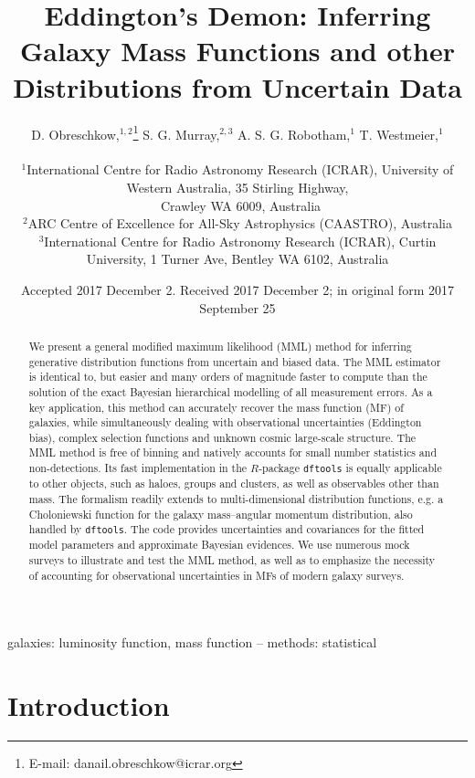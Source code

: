\documentclass[a4paper,fleqn,usenatbib]{mnras}
\title[Eddington's Demon]{Eddington's Demon: Inferring Galaxy Mass Functions and other Distributions from Uncertain Data}
\author[D. Obreschkow et al.]{
D. Obreschkow,$^{1,2}$\thanks{E-mail: danail.obreschkow@icrar.org}
S. G. Murray,$^{2,3}$
A. S. G. Robotham,$^1$
T. Westmeier,$^1$
\\
\\
$^{1}$International Centre for Radio Astronomy Research (ICRAR), University of Western Australia, 35 Stirling Highway,\\
~Crawley WA 6009, Australia\\
$^{2}$ARC Centre of Excellence for All-Sky Astrophysics (CAASTRO), Australia\\
$^{3}$International Centre for Radio Astronomy Research (ICRAR), Curtin University, 1 Turner Ave, Bentley WA 6102, Australia
}
\date{Accepted 2017 December 2. Received 2017 December 2; in original form 2017 September 25}
\newcommand{\dftools}{\texttt{dftools}\xspace}
\newcommand{\eg}{e.g.\xspace}
\begin{document}
\label{firstpage}
\pagerange{\pageref{firstpage}--\pageref{lastpage}}
\maketitle

\begin{abstract}
We present a general modified maximum likelihood (MML) method for inferring generative distribution functions from uncertain and biased data. The MML estimator is identical to, but easier and many orders of magnitude faster to compute than the solution of the exact Bayesian hierarchical modelling of all measurement errors. As a key application, this method can accurately recover the mass function (MF) of galaxies, while simultaneously dealing with observational uncertainties (Eddington bias), complex selection functions and unknown cosmic large-scale structure. The MML method is free of binning and natively accounts for small number statistics and non-detections. Its fast implementation in the $R$-package \dftools is equally applicable to other objects, such as haloes, groups and clusters, as well as observables other than mass. The formalism readily extends to multi-dimensional distribution functions, \eg a Choloniewski function for the galaxy mass--angular momentum distribution, also handled by \dftools. The code provides uncertainties and covariances for the fitted model parameters and approximate Bayesian evidences. We use numerous mock surveys to illustrate and test the MML method, as well as to emphasize the necessity of accounting for observational uncertainties in MFs of modern galaxy surveys.
\end{abstract}

\begin{keywords}
galaxies: luminosity function, mass function -- methods: statistical
\end{keywords}




\section{Introduction}\label{s:introduction}
\end{document}
